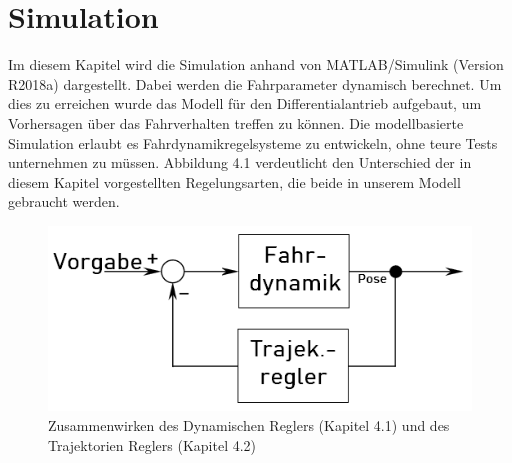 \chapter{Simulation}
\label{sec:simulation}
Im diesem Kapitel wird die Simulation anhand von MATLAB/Simulink (Version R2018a) dargestellt. Dabei werden die Fahrparameter dynamisch berechnet. Um dies zu erreichen wurde das Modell für den Differentialantrieb aufgebaut, um Vorhersagen über das Fahrverhalten treffen zu können. 
Die modellbasierte Simulation erlaubt es Fahrdynamikregelsysteme zu entwickeln, ohne teure Tests unternehmen zu müssen. Abbildung 4.1 verdeutlicht den Unterschied der in diesem Kapitel vorgestellten Regelungsarten, die beide in unserem Modell gebraucht werden.

\begin{figure}[htb]
  \centering  
  \includegraphics[scale=2]{img/vier.png}
  \caption{Zusammenwirken des Dynamischen Reglers (Kapitel 4.1) und des Trajektorien Reglers (Kapitel 4.2)}
  \label{fig:Zusammenwirken des Dynamischen Reglers (Kapitel 4.1) und des Trajektorien Reglers (Kapitel 4.2)}
\end{figure} 


